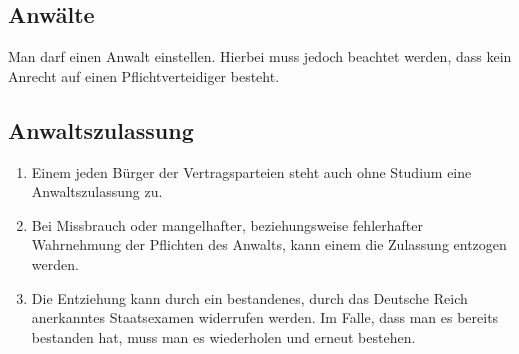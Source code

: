\documentclass{article}
\begin{document}
\subsection{Anwälte}
Man darf einen Anwalt einstellen. Hierbei muss jedoch beachtet werden, dass kein Anrecht auf einen Pflichtverteidiger besteht.

\subsection{Anwaltszulassung}
\begin{enumerate}[(1)]
    \item Einem jeden Bürger der Vertragsparteien steht auch ohne Studium eine Anwaltszulassung zu.
    \item Bei Missbrauch oder mangelhafter, beziehungsweise fehlerhafter Wahrnehmung der Pflichten des Anwalts, kann einem die Zulassung entzogen werden.
    \item Die Entziehung kann durch ein bestandenes, durch das Deutsche Reich anerkanntes Staatsexamen widerrufen werden. Im Falle, dass man es bereits bestanden hat, muss man es wiederholen und erneut bestehen.
\end{enumerate}
    
\end{document}
